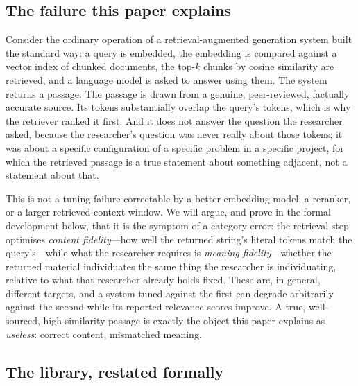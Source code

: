 \documentclass[11pt,twocolumn,a4paper]{article}
\theoremstyle{frathm}
\theoremstyle{definition}
\theoremstyle{remark}
\begin{document}
\subsection{The failure this paper explains}

Consider the ordinary operation of a retrieval-augmented generation
system built the standard way: a query is embedded, the embedding is
compared against a vector index of chunked documents, the top-$k$ chunks
by cosine similarity are retrieved, and a language model is asked to
answer using them. The system returns a passage. The passage is drawn
from a genuine, peer-reviewed, factually accurate source. Its tokens
substantially overlap the query's tokens, which is why the retriever
ranked it first. And it does not answer the question the researcher
asked, because the researcher's question was never really about those
tokens; it was about a specific configuration of a specific problem in a
specific project, for which the retrieved passage is a true statement
about something adjacent, not a statement about that.

This is not a tuning failure correctable by a better embedding model, a
reranker, or a larger retrieved-context window. We will argue, and prove
in the formal development below, that it is the symptom of a category
error: the retrieval step optimises \emph{content fidelity}---how well the
returned string's literal tokens match the query's---while what the
researcher requires is \emph{meaning fidelity}---whether the returned
material individuates the same thing the researcher is individuating,
relative to what that researcher already holds fixed. These are, in
general, different targets, and a system tuned against the first can
degrade arbitrarily against the second while its reported relevance
scores improve. A true, well-sourced, high-similarity passage is exactly
the object this paper explains as \emph{useless}: correct content,
mismatched meaning.

\subsection{The library, restated formally}
\end{document}
